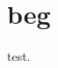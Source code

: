\documentclass{article}
\begin{document}
    \section{beg}\label{foo}
     test.
    \printvocabindex
\end{document}
